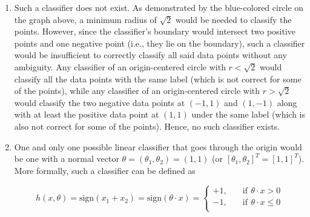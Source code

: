 \documentclass[11pt,fancychapters]{article}
\begin{document}
\begin{enumerate}[label=(\alph*)]

\item Such a classifier does not exist. As demonstrated by the blue-colored circle on the graph above, a minimum radius of $\sqrt{2}$ would be needed to classify the points. However, since the classifier's boundary would intersect two positive points and one negative point (i.e., they lie on the boundary), such a classifier would be insufficient to correctly classify all said data points without any ambiguity. Any classifier of an origin-centered circle with $r < \sqrt{2}$ would classify all the data points with the same label (which is not correct for some of the points), while any classifier of an origin-centered circle with $r > \sqrt{2}$ would classify the two negative data points at $(-1, 1)$ and $(1, -1)$ along with at least the positive data point at $(1, 1)$ under the same label (which is also not correct for some of the points). Hence, no such classifier exists.

\item One and only one possible linear classifier that goes through the origin would be one with a normal vector $\theta = (\theta_1, \theta_2) = (1, 1)$ (or $[\theta_1, \theta_2]^T = [1, 1]^T$). More formally, such a classifier can be defined as

\begin{equation*}
	h(x, \theta) = \text{sign}(x_1 + x_2) = \text{sign}(\theta \cdot x) = \begin{cases}
		+1, \quad &\text{if} \, ~ \theta \cdot x > 0 \\
		-1, \quad &\text{if} \, ~ \theta \cdot x \leq 0 \\
	\end{cases}
\end{equation*}

\end{enumerate}
\end{document}
